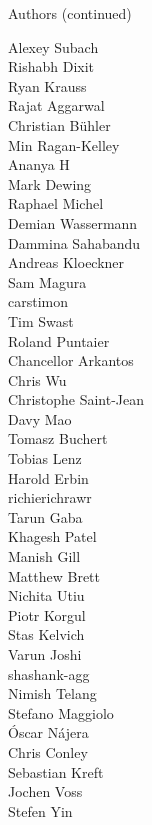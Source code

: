 \documentclass[xcolor=svgnames]{beamer}
\begin{document}
\begin{frame}{Authors (continued)}
\begin{multicols}{5}
          Alexey Subach\\
          Rishabh Dixit\\
          Ryan Krauss\\
          Rajat Aggarwal\\
          Christian Bühler\\
          Min Ragan-Kelley\\
          Ananya H\\
          Mark Dewing\\
          Raphael Michel\\
          Demian Wassermann\\
          Dammina Sahabandu\\
          Andreas Kloeckner\\
          Sam Magura\\
          carstimon\\
          Tim Swast\\
          Roland Puntaier\\
          Chancellor Arkantos\\
          Chris Wu\\
          Christophe Saint-Jean\\
          Davy Mao\\
          Tomasz Buchert\\
          Tobias Lenz\\
          Harold Erbin\\
          richierichrawr\\
          Tarun Gaba\\
          Khagesh Patel\\
          Manish Gill\\
          Matthew Brett\\
          Nichita Utiu\\
          Piotr Korgul\\
          Stas Kelvich\\
          Varun Joshi\\
          shashank-agg\\
          Nimish Telang\\
          Stefano Maggiolo\\
          Óscar Nájera\\
          Chris Conley\\
          Sebastian Kreft\\
          Jochen Voss\\
          Stefen Yin\\

\end{multicols}
\end{frame}
\end{document}
